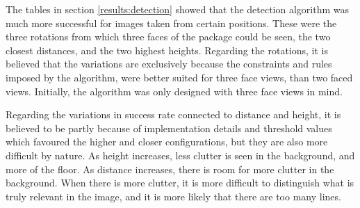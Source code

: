 The tables in section \ref{results:detection} showed that the detection algorithm was much more successful for images taken from certain positions.
These were the three rotations from which three faces of the package could be seen, the two closest distances, and the two highest heights.
Regarding the rotations, it is believed that the variations are exclusively because the constraints and rules imposed by the algorithm, were better suited for three face views, than two faced views.
Initially, the algorithm was only designed with three face views in mind.

Regarding the variations in success rate connected to distance and height, it is believed to be partly because of implementation details and threshold values which favoured the higher and closer configurations, but they are also more difficult by nature.
As height increases, less clutter is seen in the background, and more of the floor.
As distance increases, there is room for more clutter in the background.
When there is more clutter, it is more difficult to distinguish what is truly relevant in the image, and it is more likely that there are too many lines.

%



